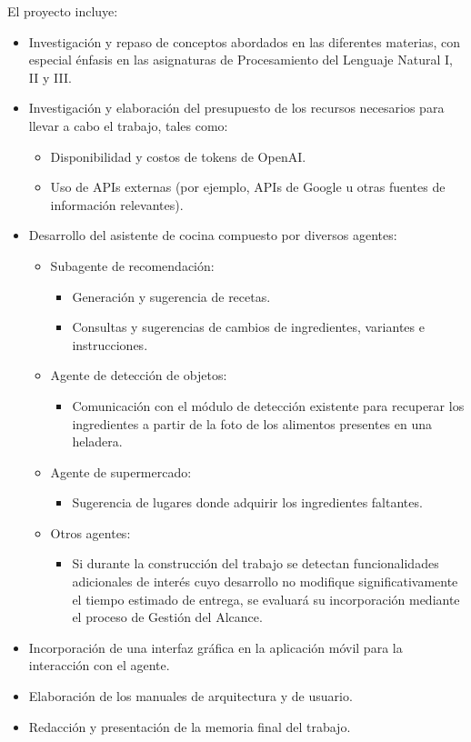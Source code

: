\documentclass[
11pt, %
]{charter}
\begin{document}
El proyecto incluye:
\begin{itemize}
    \item Investigación y repaso de conceptos abordados en las diferentes materias, con especial énfasis en las asignaturas de Procesamiento del Lenguaje Natural I, II y III.
    \item Investigación y elaboración del presupuesto de los recursos necesarios para llevar a cabo el trabajo, tales como:
    \begin{itemize}
        \item Disponibilidad y costos de tokens de OpenAI.
        \item Uso de APIs externas (por ejemplo, APIs de Google u otras fuentes de información relevantes).
    \end{itemize}
    \item Desarrollo del asistente de cocina compuesto por diversos agentes:
    \begin{itemize}
        \item Subagente de recomendación:
        \begin{itemize}
            \item Generación y sugerencia de recetas.
            \item Consultas y sugerencias de cambios de ingredientes, variantes e instrucciones.
        \end{itemize}
        \item Agente de detección de objetos:
        \begin{itemize}
            \item Comunicación con el módulo de detección existente para recuperar los ingredientes a partir de la foto de los alimentos presentes en una heladera.
        \end{itemize}
        \item Agente de supermercado:
        \begin{itemize}
            \item Sugerencia de lugares donde adquirir los ingredientes faltantes.
        \end{itemize}
        \item Otros agentes:
        \begin{itemize}
            \item Si durante la construcción del trabajo se detectan funcionalidades adicionales de interés cuyo desarrollo no modifique significativamente el tiempo estimado de entrega, se evaluará su incorporación mediante el proceso de Gestión del Alcance.
        \end{itemize}
    \end{itemize}
    \item Incorporación de una interfaz gráfica en la aplicación móvil para la interacción con el agente.
    \item Elaboración de los manuales de arquitectura y de usuario.
    \item Redacción y presentación de la memoria final del trabajo.
\end{itemize}
\end{document}
